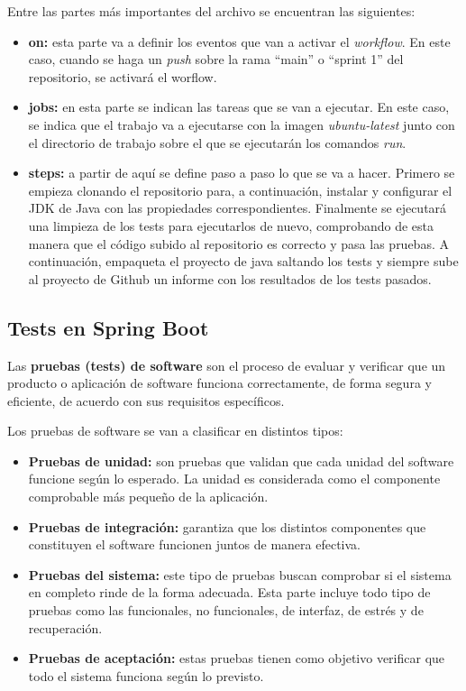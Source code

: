 Entre las partes más importantes del archivo se encuentran las siguientes:

\begin{itemize}
    \item \textbf{on:} esta parte va a definir los eventos que van a activar el \textit{workflow}. En este caso, cuando se haga un \textit{push} sobre la rama ``main''
    o ``sprint 1'' del repositorio, se activará el worflow.

    \item \textbf{jobs:} en esta parte se indican las tareas que se van a ejecutar. En este caso, se indica que el trabajo va a ejecutarse con la imagen \textit{ubuntu-latest}
    junto con el directorio de trabajo sobre el que se ejecutarán los comandos \textit{run}.

    \item \textbf{steps:} a partir de aquí se define paso a paso lo que se va a hacer. Primero se empieza clonando el repositorio para, a continuación, instalar y configurar
    el JDK de Java con las propiedades correspondientes. Finalmente se ejecutará una limpieza de los tests para ejecutarlos de nuevo, comprobando de esta manera que el
    código subido al repositorio es correcto y pasa las pruebas. A continuación, empaqueta el proyecto de java saltando los tests y siempre sube al proyecto de Github un informe
    con los resultados de los tests pasados.
\end{itemize}

\subsection{Tests en Spring Boot}

Las \textbf{pruebas (tests) de software} \cite{test} son el proceso de evaluar y verificar que un producto o aplicación de software funciona correctamente, de forma segura y eficiente, de acuerdo con sus 
requisitos específicos.

Los pruebas de software se van a clasificar en distintos tipos:

\begin{itemize}
    \item \textbf{Pruebas de unidad:} son pruebas que validan que cada unidad del software funcione según lo esperado. La unidad es considerada como el componente comprobable más
    pequeño de la aplicación.

    \item \textbf{Pruebas de integración:} garantiza que los distintos componentes que constituyen el software funcionen juntos de manera efectiva.
    
    \item \textbf{Pruebas del sistema:} este tipo de pruebas buscan comprobar si el sistema en completo rinde de la forma adecuada. Esta parte incluye todo tipo de pruebas como las funcionales,
    no funcionales, de interfaz, de estrés y de recuperación.

    \item \textbf{Pruebas de aceptación:} estas pruebas tienen como objetivo verificar que todo el sistema funciona según lo previsto.
\end{itemize}

